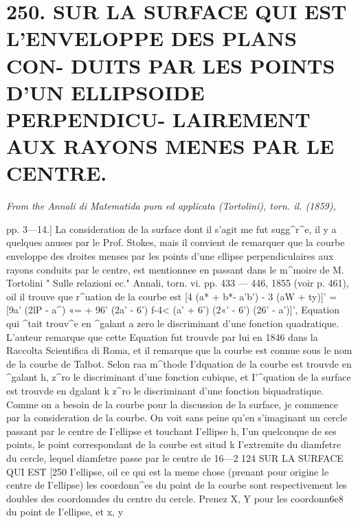 \documentclass[11pt,a4paper]{book}
\begin{document}
\section*{250. SUR  LA  SURFACE  QUI  EST  L'ENVELOPPE  DES  PLANS  CON- DUITS PAR  LES  POINTS  D'UN  ELLIPSOIDE  PERPENDICU- LAIREMENT    AUX    RAYONS    MENES    PAR    LE    CENTRE.}
\begin{flushright}
\textit{From  the  Annali  di  Matematida  pura  ed  applicata  (Tortolini),  torn.  il.  (1859),}\n\end{flushright}
\vspace{0.5em}
pp.  3—14.]
La  consideration  de  la  surface  dont  il  s'agit  me  fut  sugg^r^e,  il  y  a  quelques
anuses  par  le  Prof.  Stokes,  mais  il  convient  de  remarquer  que  la  courbe  enveloppe
des  droites  menses  par  les  points  d'une  ellipse  perpendiculaires  aux  rayons  conduits
par  le  centre,  est  mentionnee  en  passant  dans  le  m^moire  de  M.  Tortolini  "  Sulle
relazioni  ec."  Annali,  torn.  vi.  pp.  433 — 446,  1855  (voir  p.  461),  oil  il  trouve  que
r^uation  de  la  courbe  est
[4  (a*  +  b*-  a'b')  -  3  (aW  +  ty)]'
=  [9a'  (2lP  -  a^)  «=  +  96'  (2a'  -  6')  f-4<  (a'  +  6')  (2«'  -  6')  (26'  -  a')]',
Equation  qui  ^tait  trouv^e  en  ^galant  a  zero  le  discriminant  d'une  fonction  quadratique.
L'auteur  remarque  que  cette  Equation  fut  trouvde  par  lui  en  1846  dans  la  Raccolta
Scientifica  di  Roma,  et  il  remarque  que  la  courbe  est  connue  sous  le  nom  de  la
courbe   de   Talbot.
Selon  raa  m^thode  I'dquation  de  la  courbe  est  trouvde  en  ^galant  h,  z^ro  le
discriminant  d'une  fonction  cubique,  et  I'^quation  de  la  surface  est  trouvde  en  dgalant
k  z^ro  le  discriminant  d'une  fonction  biquadratique.  Comme  on  a  besoin  de  la  courbe
pour  la  discussion  de  la  surface,  je  commence  par  la  consideration  de  la  courbe.
On  voit  sans  peine  qu'en  s'imaginant  un  cercle  passant  par  le  centre  de  I'ellipse
et  touchant  I'ellipse  h,  I'un  quelconque  de  ses  points,  le  point  correspondant  de  la  courbe
est  situd  k   I'extremite   du   diamfetre   du   cercle,  lequel   diamfetre  passe   par   le   centre   de
16—2
124  SUR   LA   SURFACE   QUI    EST  [250
I'ellipse,  oil  ce  qui  est  la  meme  chose  (prenant  pour  origine  le  centre  de  I'ellipse)  les
coordonn^es  du  point  de  la  courbe  sont  respectivement  les  doubles  des  coordonndes  du
centre  du  cercle.  Prenez  X,  Y  pour  les  coordonn6e8  du  point  de  I'ellipse,  et  x,  y
\end{document}
